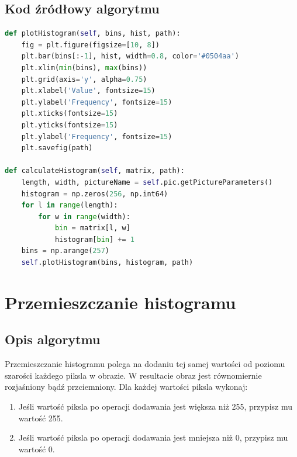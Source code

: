 \documentclass[a4paper,12pt, titlepage]{report}
\begin{document}
\subsection*{Kod źródłowy algorytmu}
\begin{lstlisting}[language=Python]
def plotHistogram(self, bins, hist, path):
    fig = plt.figure(figsize=[10, 8])
    plt.bar(bins[:-1], hist, width=0.8, color='#0504aa')
    plt.xlim(min(bins), max(bins))
    plt.grid(axis='y', alpha=0.75)
    plt.xlabel('Value', fontsize=15)
    plt.ylabel('Frequency', fontsize=15)
    plt.xticks(fontsize=15)
    plt.yticks(fontsize=15)
    plt.ylabel('Frequency', fontsize=15)
    plt.savefig(path)

def calculateHistogram(self, matrix, path):
    length, width, pictureName = self.pic.getPictureParameters()
    histogram = np.zeros(256, np.int64)
    for l in range(length):
        for w in range(width):
            bin = matrix[l, w]
            histogram[bin] += 1
    bins = np.arange(257)
    self.plotHistogram(bins, histogram, path)
\end{lstlisting}

\section{Przemieszczanie histogramu}
\subsection*{Opis algorytmu}
\par Przemieszczanie histogramu polega na dodaniu tej samej wartości od poziomu szarości każdego piksla w obrazie. W resultacie obraz jest równomiernie rozjaśniony bądź przciemniony. Dla każdej wartości piksla wykonaj:
\begin{enumerate}
\item Jeśli wartość piksla po operacji dodawania jest większa niż 255, przypisz mu wartość 255.
\item Jeśli wartość piksla po operacji dodawania jest mniejsza niż 0, przypisz mu wartość 0.
\end{enumerate}
\end{document}
